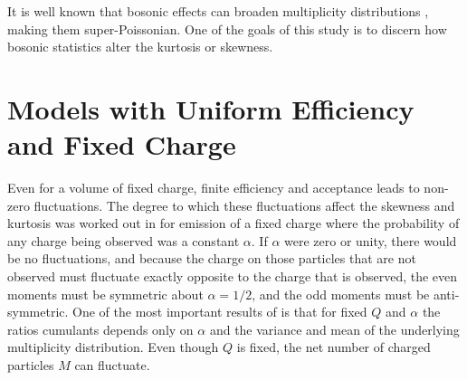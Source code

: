 \documentclass[aps,prc,nofootinbib,showpacs,superscriptaddress,groupedaddress]{revtex4-1}
\begin{document}
It is well known that bosonic effects can broaden multiplicity distributions \cite{negativebinomial}, making them super-Poissonian. One of the goals of this study is to discern how bosonic statistics alter the kurtosis or skewness. 

\section{Models with Uniform Efficiency and Fixed Charge}

Even for a volume of fixed charge, finite efficiency and acceptance leads to non-zero fluctuations. The degree to which these fluctuations affect the skewness and kurtosis was worked out in \cite{Savchuk:2019xfg} for emission of a fixed charge where the probability of any charge being observed was a constant $\alpha$. If $\alpha$ were zero or unity, there would be no fluctuations, and because the charge on those particles that are not observed must fluctuate exactly opposite to the charge that is observed, the even moments must be symmetric about $\alpha=1/2$, and the odd moments must be anti-symmetric. One of the most important results of \cite{Savchuk:2019xfg} is that for fixed $Q$ and $\alpha$ the ratios cumulants depends only on $\alpha$ and the variance and mean of the underlying multiplicity distribution. Even though $Q$ is fixed, the net number of charged particles $M$ can fluctuate. 
\end{document}
